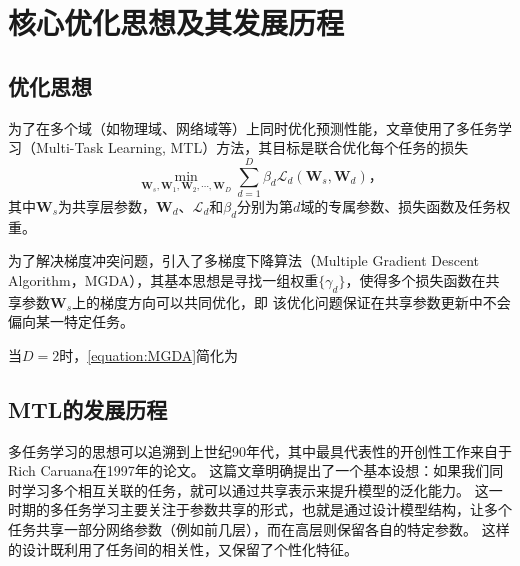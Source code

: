 \section{核心优化思想及其发展历程}

\subsection{优化思想}

为了在多个域（如物理域、网络域等）上同时优化预测性能，文章使用了多任务学习（Multi-Task Learning, MTL）\cite{ruder2017overviewmultitasklearningdeep}方法，其目标是联合优化每个任务的损失
\begin{equation*}
    \min_{\bm{W}_s,\bm{W}_1,\bm{W}_2,\cdots,\bm{W}_D}\sum_{d=1}^D\beta_d\mathcal{L}_d(\bm{W}_s,\bm{W}_d) \text{，}
\end{equation*}
其中$\bm{W}_s$为共享层参数，$\bm{W}_d$、$\mathcal{L}_d$和$\beta_d$分别为第$d$域的专属参数、损失函数及任务权重。

为了解决梯度冲突问题，引入了多梯度下降算法（Multiple Gradient Descent Algorithm，MGDA）\cite{desideri2012multiple}，其基本思想是寻找一组权重$\{\gamma_d\}$，使得多个损失函数在共享参数$\bm{W}_s$上的梯度方向可以共同优化，即
该优化问题保证在共享参数更新中不会偏向某一特定任务。

当$D=2$时，\cref{equation:MGDA}简化为

\subsection{MTL的发展历程}

多任务学习的思想可以追溯到上世纪90年代，其中最具代表性的开创性工作来自于Rich Caruana在1997年的论文\cite{caruana1997multitask}。
这篇文章明确提出了一个基本设想：如果我们同时学习多个相互关联的任务，就可以通过共享表示来提升模型的泛化能力。
这一时期的多任务学习主要关注于参数共享的形式，也就是通过设计模型结构，让多个任务共享一部分网络参数（例如前几层），而在高层则保留各自的特定参数。
这样的设计既利用了任务间的相关性，又保留了个性化特征。

